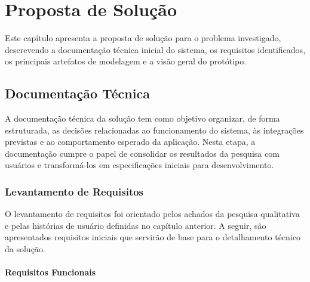 \chapter{Proposta de Solução}

Este capítulo apresenta a proposta de solução para o problema investigado, descrevendo a documentação técnica inicial do sistema, os requisitos identificados, os principais artefatos de modelagem e a visão geral do protótipo.

\section{Documentação Técnica}

A documentação técnica da solução tem como objetivo organizar, de forma estruturada, as decisões relacionadas ao funcionamento do sistema, às integrações previstas e ao comportamento esperado da aplicação. Nesta etapa, a documentação cumpre o papel de consolidar os resultados da pesquisa com usuários e transformá-los em especificações iniciais para desenvolvimento.

\subsection{Levantamento de Requisitos}

O levantamento de requisitos foi orientado pelos achados da pesquisa qualitativa e pelas histórias de usuário definidas no capítulo anterior. A seguir, são apresentados requisitos iniciais que servirão de base para o detalhamento técnico da solução.

\subsubsection{Requisitos Funcionais}

